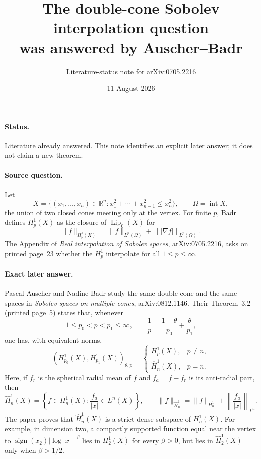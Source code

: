 \documentclass[10pt]{article}
\title{The double-cone Sobolev interpolation question\\
was answered by Auscher--Badr}
\author{Literature-status note for arXiv:0705.2216}
\date{11 August 2026}
\begin{document}
\maketitle

\paragraph{Status.}
Literature already answered.  This note identifies an explicit later answer;
it does not claim a new theorem.

\paragraph{Source question.}
Let
\[
 X=\{(x_1,\ldots,x_n)\in\mathbb R^n:
       x_1^2+\cdots+x_{n-1}^2\le x_n^2\},
 \qquad \Omega=\operatorname{int}X,
\]
the union of two closed cones meeting only at the vertex.  For finite $p$,
Badr defines $H_p^1(X)$ as the closure of $\operatorname{Lip}_0(X)$ for
\[
 \|f\|_{H_p^1(X)}=\|f\|_{L^p(\Omega)}+
                    \lVert |\nabla f|\rVert_{L^p(\Omega)}.
\]
The Appendix of \emph{Real interpolation of Sobolev spaces},
arXiv:0705.2216, asks on printed page~23 whether the $H_p^1$ interpolate for
all $1\le p\le\infty$.

\paragraph{Exact later answer.}
Pascal Auscher and Nadine Badr study the same double cone and the same spaces
in \emph{Sobolev spaces on multiple cones}, arXiv:0812.1146.  Their
Theorem~3.2 (printed page~5) states that, whenever
\[
 1\le p_0<p<p_1\le\infty,
 \qquad \frac1p=\frac{1-\theta}{p_0}+\frac{\theta}{p_1},
\]
one has, with equivalent norms,
\[
 (H_{p_0}^1(X),H_{p_1}^1(X))_{\theta,p}
 =
 \begin{cases}
 H_p^1(X),&p\ne n,\\
 \widehat H_n^1(X),&p=n.
 \end{cases}
\]
Here, if $f_r$ is the spherical radial mean of $f$ and
$f_a=f-f_r$ is its anti-radial part, then
\[
 \widehat H_n^1(X)
 =\left\{f\in H_n^1(X):\frac{f_a}{|x|}\in L^n(X)\right\},
 \qquad
 \|f\|_{\widehat H_n^1}
 =\|f\|_{H_n^1}+\left\|\frac{f_a}{|x|}\right\|_{L^n}.
\]
The paper proves that $\widehat H_n^1(X)$ is a strict dense subspace of
$H_n^1(X)$.  For example, in dimension two, a compactly supported function
equal near the vertex to
$\operatorname{sign}(x_2)|\log |x||^{-\beta}$ lies in $H_2^1(X)$ for every
$\beta>0$, but lies in $\widehat H_2^1(X)$ only when $\beta>1/2$.
\end{document}
